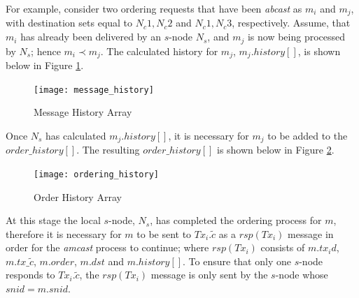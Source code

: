 \begin{enumerate}
        For example, consider two ordering requests that have been \emph{abcast} as $m_i$ and $m_j$, with destination sets equal to ${N_c1, N_c2}$ and ${N_c1, N_c3}$, respectively.  Assume, that $m_i$ has already been delivered by an $s$-node $N_s$, and $m_j$ is now being processed by $N_s$; hence $m_i \prec m_j$.  The calculated history for $m_j$, $m_j.history[]$, is shown below in Figure \ref{fig:message_history}.
        
    \begin{figure}[htbp!] 
        \centering    
         \texttt{[image: message\_history]}
         \caption[Message History Array]{Message History Array}
         \label{fig:message_history}
    \end{figure}            
        
        Once $N_s$ has calculated $m_j.history[]$, it is necessary for $m_j$ to be added to the $order\_history[]$.  The resulting $order\_history[]$ is shown below in Figure \ref{fig:ordering_history}.  
		
        \begin{figure}[htbp!] 
        \centering    
         \texttt{[image: ordering\_history]}
         \caption[Order History Array]{Order History Array}
         \label{fig:ordering_history}
    \end{figure}            
        
		
        At this stage the local $s$-node, $N_s$, has completed the ordering process for $m$, therefore it is necessary for $m$ to be sent to $Tx_i.\tilde{c}$ as a $rsp(Tx_i)$ message in order for the \emph{amcast} process to continue; where $rsp(Tx_i)$ consists of $m.tx_id$, $m.tx\_\tilde{c}$, $m.order$, $m.dst$ and $m.history[]$.  To ensure that only one $s$-node responds to $Tx_i.\tilde{c}$, the $rsp(Tx_i)$ message is only sent by the $s$-node whose $snid = m.snid$.  
        

\end{enumerate}
